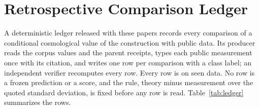 \documentclass[11pt]{article}
\begin{document}
\section{Retrospective Comparison Ledger}
\label{sec:ledger}

A deterministic ledger released with these papers records every comparison
of a conditional cosmological value of the construction with public data. Its
producer reads the corpus values and the parent receipts, types each public
measurement once with its citation, and writes one row per comparison with a
class label; an independent verifier recomputes every row. Every row is on
seen data. No row is a frozen prediction or a score, and the rule, theory
minus measurement over the quoted standard deviation, is fixed before any row
is read. Table~\ref{tab:ledger} summarizes the rows.
\end{document}
